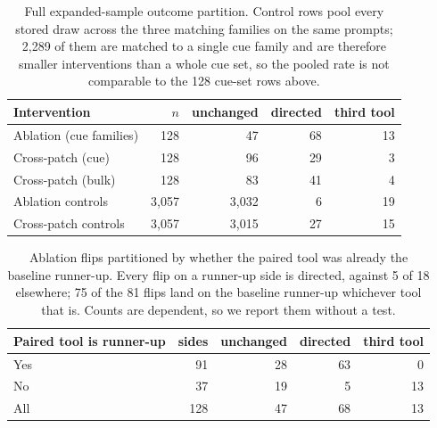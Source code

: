 \documentclass{article}
\begin{document}
\begin{table}[h]
\caption{Full expanded-sample outcome partition. Control rows pool every
stored draw across the three matching families on the same prompts; 2,289 of
them are matched to a single cue family and are therefore smaller interventions
than a whole cue set, so the pooled rate is not comparable to the 128 cue-set
rows above.}
\label{tab:outcomes}
\centering
\small
\setlength{\tabcolsep}{6pt}
\begin{tabular}{@{}lrrrr@{}}
\toprule
Intervention & $n$ & unchanged & directed & third tool \\
\midrule
Ablation (cue families)       & 128    & 47    & 68 & 13 \\
Cross-patch (cue)             & 128    & 96    & 29 & 3 \\
Cross-patch (bulk)            & 128    & 83    & 41 & 4 \\
Ablation controls             & 3,057  & 3,032 & 6  & 19 \\
Cross-patch controls          & 3,057  & 3,015 & 27 & 15 \\
\bottomrule
\end{tabular}
\end{table}

\begin{table}[h]
\caption{Ablation flips partitioned by whether the paired tool was already the
baseline runner-up. Every flip on a runner-up side is directed, against 5 of 18
elsewhere; 75 of the 81 flips land on the baseline runner-up whichever tool
that is. Counts are dependent, so we report them without a test.}
\label{tab:runnerup}
\centering
\small
\setlength{\tabcolsep}{6pt}
\begin{tabular}{@{}lrrrr@{}}
\toprule
Paired tool is runner-up & sides & unchanged & directed & third tool \\
\midrule
Yes & 91  & 28 & 63 & 0  \\
No  & 37  & 19 & 5  & 13 \\
\midrule
All & 128 & 47 & 68 & 13 \\
\bottomrule
\end{tabular}
\end{table}
\end{document}
